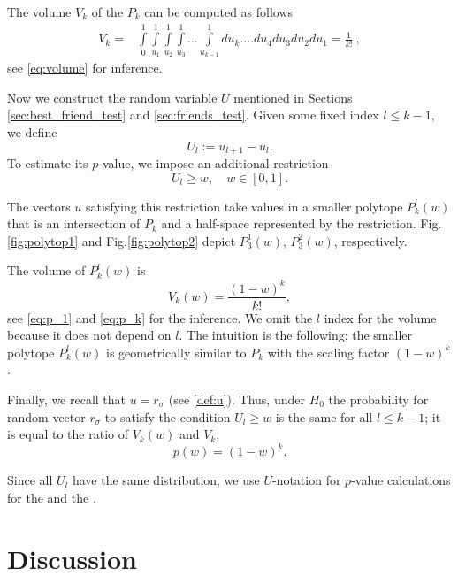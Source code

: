 \documentclass{llncs}
\begin{document}
The volume $V_k$ of the $P_k$ can be computed as follows
\begin{eqnarray*}
V_k = &\displaystyle \int\limits_0^1\int\limits_{u_1}^1\int\limits_{u_2}^1\int\limits_{u_3}^1...\int\limits_{u_{k-1}}^1 du_k....du_4 du_3 du_2 du_1 =  \frac{1}{k!}~,
\end{eqnarray*}
see \eqref{eq:volume} for inference.

Now we construct the random variable $U$ mentioned in Sections \ref{sec:best_friend_test} and \ref{sec:friends_test}. Given some fixed index $l\leq k-1$, we define
\[
U_{l} := u_{l+1} - u_{l}. 
\]
To estimate its $p$-value, we impose an additional restriction
\[
U_{l} \ge w, \quad w \in [0, 1].
\]

The vectors $u$ satisfying this restriction take values in a smaller polytope $P^{l}_{k}(w)$ that is an intersection of $P_{k}$ and a half-space represented by the restriction.
Fig.\ref{fig:polytop1} and Fig.\ref{fig:polytop2} depict $P^{1}_{3}(w)$, $P^{2}_{3}(w)$, respectively. 

The volume of $P^{l}_{k}(w)$ is 
\begin{equation}
V_{k}(w) = \frac{(1-w)^k}{k!},
\end{equation}
see \eqref{eq:p_1} and \eqref{eq:p_k} for the inference. We omit the $l$ index for the volume because it does not depend on $l$. The intuition is the following: the smaller polytope $P^{l}_{k}(w)$ is geometrically similar to $P_{k}$ with the scaling factor $(1-w)^k$. 

Finally, we recall that $u = r_{\sigma}$ (see \eqref{def:u}). Thus, under $H_0$ the probability for random vector $r_{\sigma}$ to satisfy the condition $U_{l} \ge w$ is the same for all $l\leq k-1$; it is equal to the ratio of $V_{k}(w)$ and $V_k$,
\[
p(w) = (1-w)^k.
\]

Since all $U_l$ have the same distribution, we use $U$-notation for $p$-value calculations for the  and the .


\section{Discussion}
\end{document}
